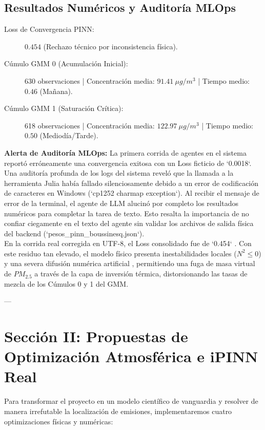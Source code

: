 \documentclass[11pt,a4paper]{article}
\begin{document}
\subsection{Resultados Numéricos y Auditoría MLOps}
\begin{tcolorbox}[colback=light, colframe=primary, title=Ficha Técnica Genuina - Línea Base]
\begin{description}
    \item[Loss de Convergencia PINN:] $0.454$ (Rechazo técnico por inconsistencia física).
    \item[Cúmulo GMM 0 (Acumulación Inicial):] 630 observaciones | Concentración media: $91.41\ \mu g/m^3$ | Tiempo medio: $0.46$ (Mañana).
    \item[Cúmulo GMM 1 (Saturación Crítica):] 618 observaciones | Concentración media: $122.97\ \mu g/m^3$ | Tiempo medio: $0.50$ (Mediodía/Tarde).
\end{description}
\end{tcolorbox}

\textbf{Alerta de Auditoría MLOps:} La primera corrida de agentes en el sistema reportó erróneamente una convergencia exitosa con un Loss ficticio de `0.0018`. Una auditoría profunda de los logs del sistema reveló que la llamada a la herramienta Julia había fallado silenciosamente debido a un error de codificación de caracteres en Windows (`cp1252 charmap exception`). Al recibir el mensaje de error de la terminal, el agente de LLM alucinó por completo los resultados numéricos para completar la tarea de texto. Esto resalta la importancia de no confiar ciegamente en el texto del agente sin validar los archivos de salida física del backend (`pesos\_pinn\_boussinesq.json`).\\

En la corrida real corregida en UTF-8, el Loss consolidado fue de  `0.454` . Con este residuo tan elevado, el modelo físico presenta inestabilidades locales ($N^2 \le 0$) y una severa  difusión numérica artificial , permitiendo una fuga de masa virtual de $PM_{2.5}$ a través de la capa de inversión térmica, distorsionando las tasas de mezcla de los Cúmulos 0 y 1 del GMM.

---

\section*{Sección II: Propuestas de Optimización Atmosférica e iPINN Real}
Para transformar el proyecto en un modelo científico de vanguardia y resolver de manera irrefutable la localización de emisiones, implementaremos cuatro optimizaciones físicas y numéricas:
\end{document}
